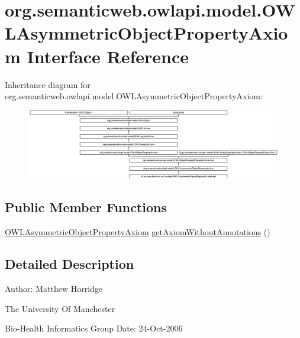 \hypertarget{interfaceorg_1_1semanticweb_1_1owlapi_1_1model_1_1_o_w_l_asymmetric_object_property_axiom}{\section{org.\-semanticweb.\-owlapi.\-model.\-O\-W\-L\-Asymmetric\-Object\-Property\-Axiom Interface Reference}
\label{interfaceorg_1_1semanticweb_1_1owlapi_1_1model_1_1_o_w_l_asymmetric_object_property_axiom}
}
Inheritance diagram for org.\-semanticweb.\-owlapi.\-model.\-O\-W\-L\-Asymmetric\-Object\-Property\-Axiom\-:\begin{figure}[H]
\begin{center}
\leavevmode
\includegraphics[height=3.060109cm]{interfaceorg_1_1semanticweb_1_1owlapi_1_1model_1_1_o_w_l_asymmetric_object_property_axiom}
\end{center}
\end{figure}
\subsection*{Public Member Functions}
\begin{DoxyCompactItemize}
\item 
\hyperlink{interfaceorg_1_1semanticweb_1_1owlapi_1_1model_1_1_o_w_l_asymmetric_object_property_axiom}{O\-W\-L\-Asymmetric\-Object\-Property\-Axiom} \hyperlink{interfaceorg_1_1semanticweb_1_1owlapi_1_1model_1_1_o_w_l_asymmetric_object_property_axiom_a93f866fac2034f763fc2442c97ea475e}{get\-Axiom\-Without\-Annotations} ()
\end{DoxyCompactItemize}


\subsection{Detailed Description}
Author\-: Matthew Horridge\par
 The University Of Manchester\par
 Bio-\/\-Health Informatics Group Date\-: 24-\/\-Oct-\/2006 

